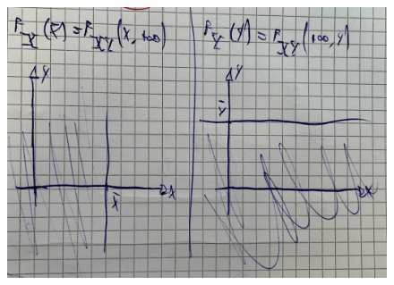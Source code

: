 \documentclass{article}
\begin{document}
\begin{figure}[H]
\centering
\includegraphics[scale=0.12]{images/77.CDF_Marg_Cont.jpeg}
\end{figure} 
\end{document}

